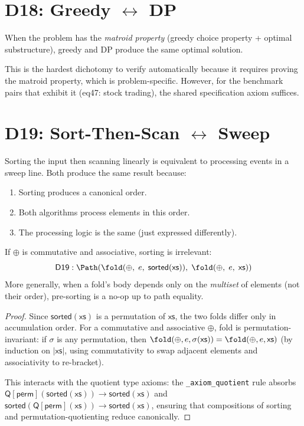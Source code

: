 \section{D18: Greedy $\leftrightarrow$ DP}

When the problem has the \emph{matroid property} (greedy choice
property + optimal substructure), greedy and DP produce the same
optimal solution.

This is the hardest dichotomy to verify automatically because it
requires proving the matroid property, which is problem-specific.
However, for the benchmark pairs that exhibit it (eq47: stock
trading), the shared specification axiom suffices.

\section{D19: Sort-Then-Scan $\leftrightarrow$ Sweep}
\label{sec:d19-sort}

Sorting the input then scanning linearly is equivalent to processing
events in a sweep line.  Both produce the same result because:
\begin{enumerate}
  \item Sorting produces a canonical order.
  \item Both algorithms process elements in this order.
  \item The processing logic is the same (just expressed differently).
\end{enumerate}

\begin{theorem}
\label{thm:d19-sort}
If $\oplus$ is commutative and associative, sorting is irrelevant:
\[
  \mathsf{D19} : \Path\!\left(
    \fold(\oplus,\; e,\; \mathsf{sorted}(\mathsf{xs})),\;
    \fold(\oplus,\; e,\; \mathsf{xs})
  \right)
\]
More generally, when a fold's body depends only on the
\emph{multiset} of elements (not their order), pre-sorting is a
no-op up to path equality.
\end{theorem}

\begin{proof}
Since $\mathsf{sorted}(\mathsf{xs})$ is a permutation of $\mathsf{xs}$,
the two folds differ only in accumulation order.  For a commutative
and associative $\oplus$, fold is permutation-invariant: if
$\sigma$ is any permutation, then
$\fold(\oplus, e, \sigma(\mathsf{xs})) = \fold(\oplus, e, \mathsf{xs})$
(by induction on $|\mathsf{xs}|$, using commutativity to swap adjacent
elements and associativity to re-bracket).

This interacts with the quotient type axioms: the
\texttt{\_axiom\_quotient} rule absorbs
$\mathsf{Q}[\mathsf{perm}](\mathsf{sorted}(\mathsf{xs})) \to
\mathsf{sorted}(\mathsf{xs})$ and
$\mathsf{sorted}(\mathsf{Q}[\mathsf{perm}](\mathsf{xs})) \to
\mathsf{sorted}(\mathsf{xs})$, ensuring that compositions of sorting
and permutation-quotienting reduce canonically.
\end{proof}

